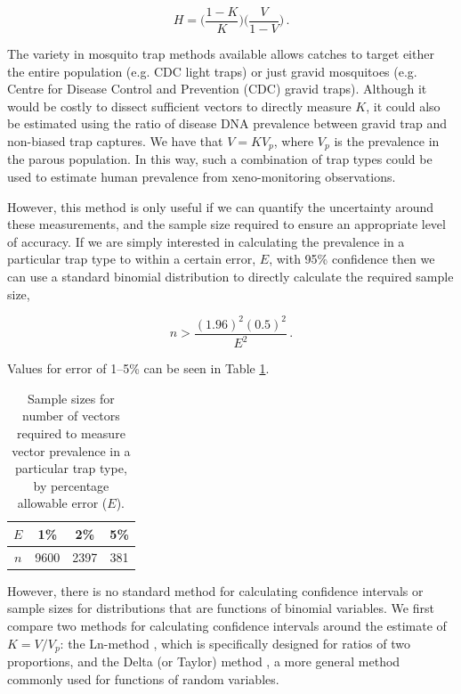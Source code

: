 \begin{equation}
    H = \Bigg(\frac{1-K}{K}\Bigg)\Bigg(\frac{V}{1-V}\Bigg)\,.
    \label{eqn:H}
\end{equation}

The variety in mosquito trap methods available allows catches to target either the entire population (e.g. CDC light traps) or just gravid mosquitoes (e.g. Centre for Disease Control and Prevention (CDC) gravid traps). Although it would be costly to dissect sufficient vectors to directly measure $K$, it could also be estimated using the ratio of disease DNA prevalence between gravid trap and non-biased trap captures. We have that $V=KV_p$, where $V_p$ is the prevalence in the parous population. In this way, such a combination of trap types could be used to estimate human prevalence from xeno-monitoring observations.

However, this method is only useful if we can quantify the uncertainty around these measurements, and the sample size required to ensure an appropriate level of accuracy. If we are simply interested in calculating the prevalence in a particular trap type to within a certain error, $E$, with 95\% confidence then we can use a standard binomial distribution to directly calculate the required sample size,

\begin{equation}
    n > \frac{(1.96)^2(0.5)^2}{E^2}\,.
\end{equation}

Values for error of 1--5\% can be seen in Table \ref{tab:sampleV}.

\begin{table}[]
    \centering
    \begin{tabular}{c|c c c}
        $E$ & 1\% & 2\% & 5\% \\
        \hline
        $n$ & 9600 & 2397 & 381
    \end{tabular}
    \caption{Sample sizes for number of vectors required to measure vector prevalence in a particular trap type, by percentage allowable error ($E$).}
    \label{tab:sampleV}
\end{table}

However, there is no standard method for calculating confidence intervals or sample sizes for distributions that are functions of binomial variables. We first compare two methods for calculating confidence intervals around the estimate of $K=V/V_p$: the Ln-method \cite{Katz1978,Koopman1984}, which is specifically designed for ratios of two proportions, and the Delta (or Taylor) method \cite{Doob1935}, a more general method commonly used for functions of random variables. 


